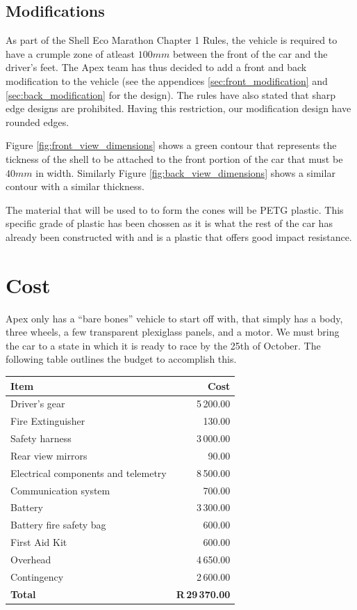 \documentclass[a4paper, 12pt]{article}
\begin{document}
		\subsection{Modifications}
		\label{sub:modifications}
			As part of the Shell Eco Marathon Chapter 1 Rules, the vehicle is required to have a crumple zone of atleast $100mm$ between the front of the car and the driver's feet. The Apex team has thus decided to add a front and back modification to the vehicle (see the appendices \ref{sec:front_modification} and \ref{sec:back_modification} for the design). The rules have also stated that sharp edge designs are prohibited. Having this restriction, our modification design have rounded edges.

			Figure \ref{fig:front_view_dimensions} shows a green contour that represents the tickness of the shell to be attached to the front portion of the car that must be $40mm$ in width. Similarly Figure \ref{fig:back_view_dimensions} shows a similar contour with a similar thickness.

			The material that will be used to to form the cones will be PETG plastic. This specific grade of plastic has been chossen as it is what the rest of the car has already been constructed with and is a plastic that offers good impact resistance. 

	\section{Cost} %
	\label{sec:cost}
		Apex only has a ``bare bones'' vehicle to start off with, that simply has a body, three wheels, a few transparent plexiglass panels, and a motor. We must bring the car to a state in which it is ready to race by the 25th of October. The following table outlines the budget to accomplish this.

		\begin{table}[H]
			\begin{tabularx}{\textwidth}{Xr}
				\toprule
				\textbf{Item} & \textbf{Cost} \\
				\midrule
				Driver's gear & 5\,200.00 \\
				Fire Extinguisher & 130.00 \\
				Safety harness & 3\,000.00 \\
				Rear view mirrors & 90.00 \\
				\addlinespace[0.7em]
				Electrical components and telemetry & 8\,500.00 \\
				Communication system & 700.00 \\
				Battery & 3\,300.00 \\
				Battery fire safety bag & 600.00 \\
				\addlinespace[0.7em]
				First Aid Kit & 600.00 \\
				Overhead & 4\,650.00 \\
				Contingency & 2\,600.00 \\
				\addlinespace[0.3em]
				\midrule
				\textbf{Total} & \textbf{R\,29\,370.00}\\
				\bottomrule
			\end{tabularx}
		\end{table}
\end{document}
